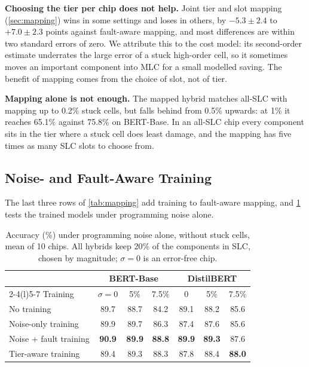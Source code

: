 \textbf{Choosing the tier per chip does not help.} Joint tier and slot mapping (\cref{sec:mapping}) wins in
some settings and loses in others, by $-5.3\pm2.4$ to $+7.0\pm2.3$ points against fault-aware mapping, and
most differences are within two standard errors of zero. We attribute this to the cost model: its
second-order estimate underrates the large error of a stuck high-order cell, so it sometimes moves an
important component into MLC for a small modelled saving. The benefit of mapping comes from the choice of
slot, not of tier.

\textbf{Mapping alone is not enough.} The mapped hybrid matches all-SLC with mapping up to 0.2\% stuck
cells, but falls behind from 0.5\% upwards: at 1\% it reaches 65.1\% against 75.8\% on BERT-Base. In an
all-SLC chip every component sits in the tier where a stuck cell does least damage, and the mapping has
five times as many SLC slots to choose from.

\subsection{Noise- and Fault-Aware Training}
The last three rows of \cref{tab:mapping} add training to fault-aware mapping, and \cref{tab:trainnoise}
tests the trained models under programming noise alone.

\begin{table}[t]
\centering\footnotesize
\caption{Accuracy (\%) under programming noise alone, without stuck cells, mean of 10 chips. All hybrids
keep 20\% of the components in SLC, chosen by magnitude; $\sigma=0$ is an error-free chip.}\label{tab:trainnoise}
\setlength{\tabcolsep}{4pt}
\begin{tabular}{@{}lccc@{\hskip 10pt}ccc@{}}
\toprule
& \multicolumn{3}{c}{BERT-Base} & \multicolumn{3}{c}{DistilBERT} \\
\cmidrule(lr){2-4}\cmidrule(l){5-7}
Training & $\sigma=0$ & 5\% & 7.5\% & 0 & 5\% & 7.5\% \\
\midrule
No training       & 89.7 & 88.7 & 84.2 & 89.1 & 88.2 & 85.6 \\
Noise-only training & 89.9 & 89.7 & 86.3 & 87.4 & 87.6 & 85.6 \\
Noise + fault training & \textbf{90.9} & \textbf{89.9} & \textbf{88.8} & \textbf{89.9} & \textbf{89.3} & 87.6 \\
Tier-aware training & 89.4 & 89.3 & 88.3 & 87.8 & 88.4 & \textbf{88.0} \\
\bottomrule
\end{tabular}
\end{table}

